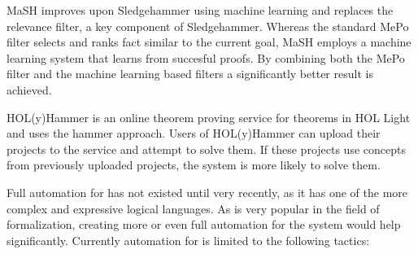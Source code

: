 MaSH \cite{kuhlwein2013mash} improves upon Sledgehammer using machine learning and replaces the relevance filter, a key component of Sledgehammer.
Whereas the standard MePo filter \cite{meng2009lightweight} selects and ranks fact similar to the current goal,
MaSH employs a machine learning system that learns from succesful proofs.
By combining both the MePo filter and the machine learning based filters a significantly better result is achieved.

HOL(y)Hammer \cite{kaliszyk2013hol} is an online theorem proving service for theorems in HOL Light and uses the hammer approach.
Users of HOL(y)Hammer can upload their projects to the service and attempt to solve them.
If these projects use concepts from previously uploaded projects, the system is more likely to solve them.

Full automation for \coq has not existed until very recently, as it has one of the more complex and expressive logical languages.
As \coq is very popular in the field of formalization, creating more or even full automation for the system would help significantly.
Currently automation for \coq is limited to the following tactics:

